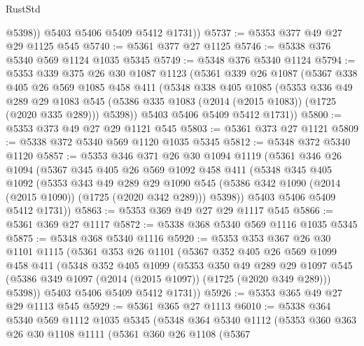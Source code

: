 \begin{lexlean}{RustStd}
\begin{coremodule}
            @5398))
        @5403
        @5406
        @5409
        @5412
        @1731))
@5737 := @5353 @377 @49 @27 @29 @1125 @545
@5740 := @5361 @377 @27 @1125
@5746 := @5338 @376 @5340 @569 @1124 @1035 @5345
@5749 := @5348 @376 @5340 @1124
@5794 := @5353
    @339
    @375
    @26
    @30
    @1087
    @1123
    (@5361
      @339
      @26
      @1087
      (@5367
        @338
        @405
        @26
        @569
        @1085
        @458
        @411
        (@5348
          @338
          @405
          @1085
          (@5353
            @336
            @49
            @289
            @29
            @1083
            @545
            (@5386 @335 @1083 (@2014 (@2015 @1083)) (@1725 (@2020 @335 @289)))
            @5398))
        @5403
        @5406
        @5409
        @5412
        @1731))
@5800 := @5353 @373 @49 @27 @29 @1121 @545
@5803 := @5361 @373 @27 @1121
@5809 := @5338 @372 @5340 @569 @1120 @1035 @5345
@5812 := @5348 @372 @5340 @1120
@5857 := @5353
    @346
    @371
    @26
    @30
    @1094
    @1119
    (@5361
      @346
      @26
      @1094
      (@5367
        @345
        @405
        @26
        @569
        @1092
        @458
        @411
        (@5348
          @345
          @405
          @1092
          (@5353
            @343
            @49
            @289
            @29
            @1090
            @545
            (@5386 @342 @1090 (@2014 (@2015 @1090)) (@1725 (@2020 @342 @289)))
            @5398))
        @5403
        @5406
        @5409
        @5412
        @1731))
@5863 := @5353 @369 @49 @27 @29 @1117 @545
@5866 := @5361 @369 @27 @1117
@5872 := @5338 @368 @5340 @569 @1116 @1035 @5345
@5875 := @5348 @368 @5340 @1116
@5920 := @5353
    @353
    @367
    @26
    @30
    @1101
    @1115
    (@5361
      @353
      @26
      @1101
      (@5367
        @352
        @405
        @26
        @569
        @1099
        @458
        @411
        (@5348
          @352
          @405
          @1099
          (@5353
            @350
            @49
            @289
            @29
            @1097
            @545
            (@5386 @349 @1097 (@2014 (@2015 @1097)) (@1725 (@2020 @349 @289)))
            @5398))
        @5403
        @5406
        @5409
        @5412
        @1731))
@5926 := @5353 @365 @49 @27 @29 @1113 @545
@5929 := @5361 @365 @27 @1113
@6010 := @5338
    @364
    @5340
    @569
    @1112
    @1035
    @5345
    (@5348
      @364
      @5340
      @1112
      (@5353
        @360
        @363
        @26
        @30
        @1108
        @1111
        (@5361
          @360
          @26
          @1108
          (@5367

\end{coremodule}
\end{lexlean}
